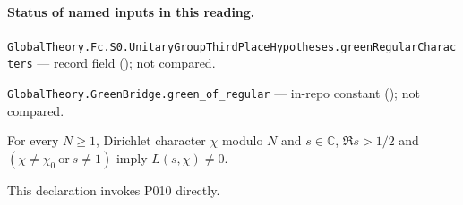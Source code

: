 

\paragraph{Status of named inputs in this reading.}
\noindent\nolinkurl{GlobalTheory.Fc.S0.UnitaryGroupThirdPlaceHypotheses.greenRegularCharacters} --- record field (); not compared.\par
\noindent\nolinkurl{GlobalTheory.GreenBridge.green_of_regular} --- in-repo constant (); not compared.\par

\begin{formalstatement}\label{pn:P009}
For every $N\ge1$, Dirichlet character $\chi$ modulo $N$ and $s\in\mathbb C$, $\Re s>1/2$ and $(\chi\ne\chi_0\ \text{or}\ s\ne1)$ imply $L(s,\chi)\ne0$.
\end{formalstatement}
This declaration invokes P010 directly.
